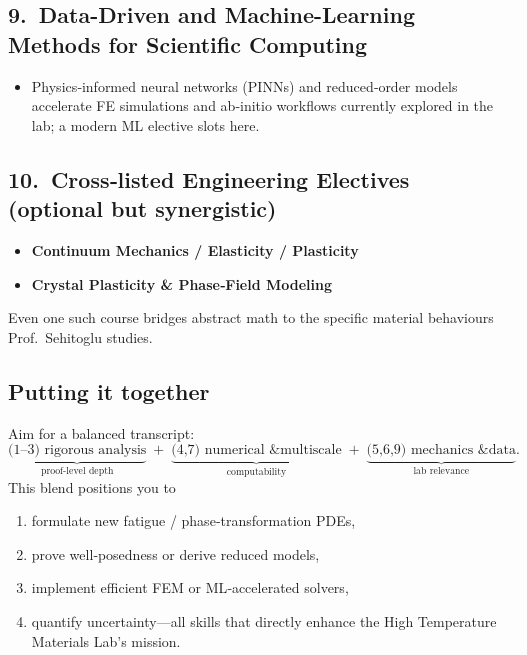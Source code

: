 \documentclass[12pt]{article}
\theoremstyle{definition} %
\theoremstyle{plain} %
\begin{document}
\subsection*{9.\  Data-Driven and Machine-Learning Methods for Scientific Computing}
\begin{itemize}
  \item Physics‑informed neural networks (PINNs) and reduced‐order
        models accelerate FE simulations and ab‑initio workflows
        currently explored in the lab; a modern ML elective slots here.
\end{itemize}

\subsection*{10.\  Cross‑listed Engineering Electives (optional but synergistic)}
\begin{itemize}
  \item \textbf{Continuum Mechanics / Elasticity / Plasticity}
  \item \textbf{Crystal Plasticity \& Phase‐Field Modeling}
\end{itemize}
Even one such course bridges abstract math to the specific material
behaviours Prof.\ Sehitoglu studies.

\subsection*{Putting it together}
Aim for a balanced transcript:
\[
  \underbrace{\text{(1–3) rigorous analysis}}_{\text{proof‐level depth}}
  \;+\;
  \underbrace{\text{(4,7) numerical \& multiscale}}_{\text{computability}}
  \;+\;
  \underbrace{\text{(5,6,9) mechanics \& data}}_{\text{lab relevance}}.
\]
This blend positions you to
\begin{enumerate}
  \item formulate new fatigue / phase‐transformation PDEs,
  \item prove well‐posedness or derive reduced models,
  \item implement efficient FEM or ML‑accelerated solvers,
  \item quantify uncertainty—all skills that directly enhance the
        High Temperature Materials Lab’s mission.
\end{enumerate}
\end{document}
